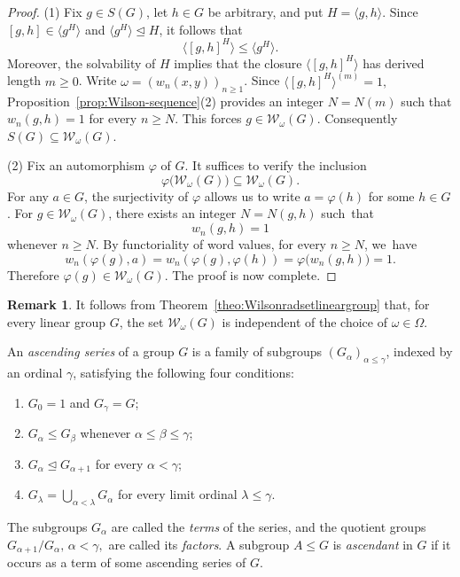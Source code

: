 \documentclass[11pt, reqno]{amsart}
\numberwithin{equation}{section}
\theoremstyle{definition}
\newtheorem{Remark}[theorem]{Remark}
\numberwithin{equation}{section}
\begin{document}
\begin{proof} (1) 
Fix $g\in S(G)$, let $h\in G$ be arbitrary, and put $H=\langle g,h\rangle$. 
Since $[g,h]\in\langle g^H\rangle$ and $\langle g^H\rangle\trianglelefteq H$, it follows that
  $$\bigl\langle [g,h]^H\bigr\rangle
  \leq
  \langle g^H\rangle.$$
Moreover, the solvability of $H$ implies that the closure $\bigl\langle [g,h]^H \bigr\rangle$ has derived length $m \geq 0$. 
Write $\omega=(w_n(x,y))_{n\geq 1}$. 
Since   $\bigl\langle [g,h]^H\bigr\rangle^{(m)}=1,$ Proposition~\ref{prop:Wilson-sequence}\textup{(2)} provides an integer $N=N(m)$ such that $w_n(g,h)=1$ for every $n\geq N$. 
This forces $ g \in \mathcal{W}_{\omega}(G) $. 
Consequently  $S(G) \subseteq \mathcal{W}_{\omega}(G).$

    \medskip

        (2) Fix an automorphism $ \varphi $ of $ G $. 
        It suffices to verify the inclusion $$\varphi\bigl(\mathcal{W}_{\omega}(G)\bigr) \subseteq \mathcal{W}_{\omega}(G).$$
 For any $a \in G$, the surjectivity of $\varphi$ allows us to write $a = \varphi(h)$ for some $h \in G$. 
 For $g\in\mathcal W_\omega(G)$, there exists an integer $N=N(g,h)$ such~that
  $$w_n(g,h)=1$$ whenever $n\geq N$.
By functoriality of word values, for every $n\geq N$, we~have $$ w_n(\varphi(g),a) = w_n(\varphi(g),\varphi(h)) = \varphi\bigl(w_n(g,h)\bigr) = 1. $$  
Therefore $\varphi(g)\in\mathcal W_\omega(G)$. The proof is now complete.
\end{proof}

\begin{Remark} \label{rm:24}
It follows from Theorem~\ref{theo:Wilsonradsetlineargroup} that, for every linear group $G$, the set $\mathcal W_\omega(G)$ is independent of the choice of $\omega\in\Omega$.
\end{Remark}

An \emph{ascending series} of a group $G$ is a family of subgroups $(G_\alpha)_{\alpha\leq\gamma}$, indexed by an ordinal $\gamma$, satisfying the following four conditions:
\begin{enumerate}
\item[(i)] $G_0=1$ and $G_\gamma=G$;
\item[(ii)] $G_\alpha\leq G_\beta$ whenever $\alpha\leq\beta\leq\gamma$;
\item[(iii)] $G_\alpha\trianglelefteq G_{\alpha+1}$ for every $\alpha<\gamma$;
\item[(iv)] $G_\lambda=\bigcup_{\alpha<\lambda}G_\alpha$ for every limit ordinal $\lambda\leq\gamma$.
\end{enumerate}
The subgroups $G_\alpha$ are
called the \emph{terms} of the series, and the quotient groups
$G_{\alpha+1}/G_\alpha,
\,
\alpha<\gamma,$
are called its \emph{factors}. A subgroup $A\leq G$ is \emph{ascendant} in $G$ if it occurs as a term of some ascending series of $G$.
\end{document}
